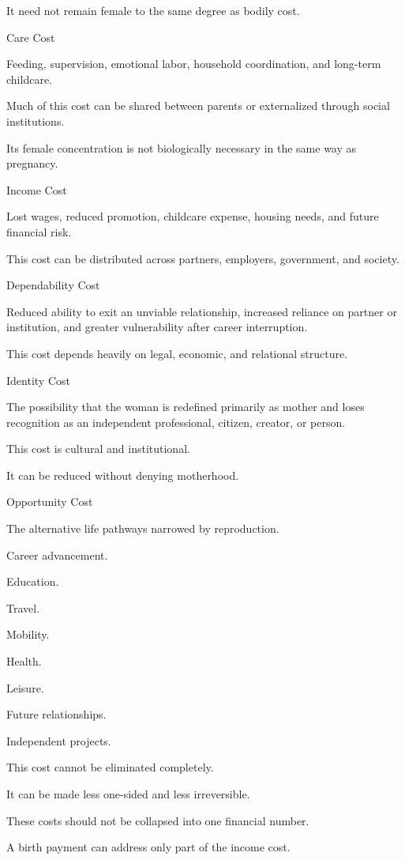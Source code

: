 It need not remain female to the same degree as bodily cost.

Care Cost

Feeding, supervision, emotional labor, household coordination, and long-term childcare.

Much of this cost can be shared between parents or externalized through social institutions.

Its female concentration is not biologically necessary in the same way as pregnancy.

Income Cost

Lost wages, reduced promotion, childcare expense, housing needs, and future financial risk.

This cost can be distributed across partners, employers, government, and society.

Dependability Cost

Reduced ability to exit an unviable relationship, increased reliance on partner or institution, and greater vulnerability after career interruption.

This cost depends heavily on legal, economic, and relational structure.

Identity Cost

The possibility that the woman is redefined primarily as mother and loses recognition as an independent professional, citizen, creator, or person.

This cost is cultural and institutional.

It can be reduced without denying motherhood.

Opportunity Cost

The alternative life pathways narrowed by reproduction.

Career advancement.

Education.

Travel.

Mobility.

Health.

Leisure.

Future relationships.

Independent projects.

This cost cannot be eliminated completely.

It can be made less one-sided and less irreversible.

These costs should not be collapsed into one financial number.

A birth payment can address only part of the income cost.

